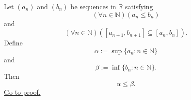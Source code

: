 \begin{lemma}
\label{lem:endpoint-supremum-infimum-inequality}
Let $(a_n)$ and $(b_n)$ be sequences in $\mathbb{R}$ satisfying
\[
  (\forall n\in\mathbb{N})(a_n\leq b_n)
\]
and
\[
  (\forall n\in\mathbb{N})([a_{n+1},b_{n+1}]\subseteq [a_n,b_n]).
\]
Define
\[
  \alpha:=\sup\{a_n:n\in\mathbb{N}\}
\]
and
\[
  \beta:=\inf\{b_n:n\in\mathbb{N}\}.
\]
Then
\[
  \alpha\leq\beta.
\]
\hyperref[prf:endpoint-supremum-infimum-inequality]{Go to proof.}
\end{lemma}